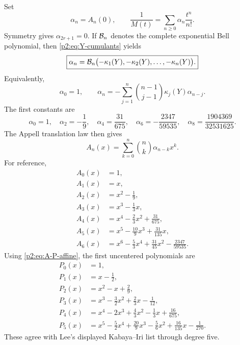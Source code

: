 \documentclass[11pt,oneside]{article}
\numberwithin{equation}{section}
\theoremstyle{definition}
\theoremstyle{remark}
\begin{document}
Set
\begin{equation}
 \alpha_n=A_n(0),
 \qquad
 \frac1{M(t)}=\sum_{n\ge0}\alpha_n\frac{t^n}{n!}.
 \label{p2:eq:alpha-def}
\end{equation}
Symmetry gives $\alpha_{2r+1}=0$.  If $\mathcal B_n$ denotes the complete exponential Bell polynomial,
then \eqref{p2:eq:Y-cumulants} yields
\begin{equation}
 \boxed{
 \alpha_n=\mathcal B_n\bigl(-\kappa_1(Y),-\kappa_2(Y),\ldots,-\kappa_n(Y)\bigr).
 }
 \label{p2:eq:alpha-Bell}
\end{equation}
Equivalently,
\begin{equation}
 \alpha_0=1,
 \qquad
 \alpha_n=-\sum_{j=1}^n\binom{n-1}{j-1}\kappa_j(Y)\alpha_{n-j}.
 \label{p2:eq:alpha-recurrence}
\end{equation}
The first constants are
\begin{equation}
 \alpha_0=1,
 \quad \alpha_2=-\frac19,
 \quad \alpha_4=\frac{31}{675},
 \quad \alpha_6=-\frac{2347}{59535},
 \quad \alpha_8=\frac{1904369}{32531625}.
 \label{p2:eq:alpha-first}
\end{equation}
The Appell translation law then gives
\begin{equation}
 A_n(x)=\sum_{k=0}^n\binom nk\alpha_{n-k}x^k.
 \label{p2:eq:A-from-alpha}
\end{equation}
For reference,
\begin{equation}
\begin{aligned}
 A_0(x)&=1,\\
 A_1(x)&=x,\\
 A_2(x)&=x^2-\frac19,\\
 A_3(x)&=x^3-\frac13x,\\
 A_4(x)&=x^4-\frac23x^2+\frac{31}{675},\\
 A_5(x)&=x^5-\frac{10}{9}x^3+\frac{31}{135}x,\\
 A_6(x)&=x^6-\frac53x^4+\frac{31}{45}x^2-\frac{2347}{59535}.
\end{aligned}
\label{p2:eq:A-first-polys}
\end{equation}
Using \eqref{p2:eq:A-P-affine}, the first uncentered polynomials are
\begin{equation}
\begin{aligned}
 P_0(x)&=1,\\
 P_1(x)&=x-\frac12,\\
 P_2(x)&=x^2-x+\frac29,\\
 P_3(x)&=x^3-\frac32x^2+\frac23x-\frac1{12},\\
 P_4(x)&=x^4-2x^3+\frac43x^2-\frac13x+\frac{16}{675},\\
 P_5(x)&=x^5-\frac52x^4+\frac{20}{9}x^3-\frac56x^2+\frac{16}{135}x-\frac1{270}.
\end{aligned}
\label{p2:eq:P-first-polys}
\end{equation}
These agree with Lee's displayed Kabaya--Iri list through degree five.
\end{document}
